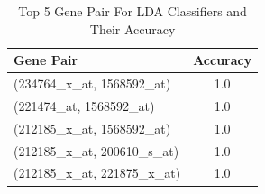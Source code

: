 \documentclass[final]{article}
\begin{document}
\begin{table}[H]
\centering
\caption{Top 5 Gene Pair For LDA Classifiers and Their Accuracy}
\label{tab:gene_pairs}
\begin{tabular}{@{}lc@{}}
\toprule
\textbf{Gene Pair} & \textbf{Accuracy} \\ \midrule
(234764\_x\_at, 1568592\_at) & 1.0 \\
(221474\_at, 1568592\_at) & 1.0 \\
(212185\_x\_at, 1568592\_at) & 1.0 \\
(212185\_x\_at, 200610\_s\_at) & 1.0 \\
(212185\_x\_at, 221875\_x\_at) & 1.0 \\ \bottomrule
\end{tabular}
\end{table}
\end{document}
